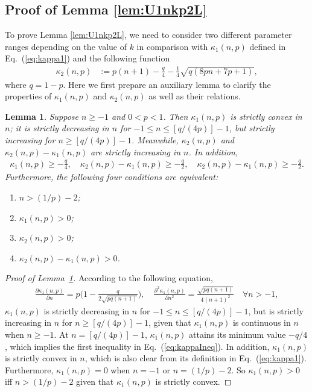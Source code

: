 \documentclass[aop]{imsart}
\theoremstyle{plain}
\newtheorem{lemma}[theorem]{Lemma}
\theoremstyle{remark}
\newcommand{\1}{\operatorname{\uppercase\expandafter{\romannumeral1}}}
\newcommand{\2}{\operatorname{\uppercase\expandafter{\romannumeral2}}}
\newcommand{\3}{\operatorname{\uppercase\expandafter{\romannumeral3}}}
\newcommand{\4}{\operatorname{\uppercase\expandafter{\romannumeral4}}}
\newcommand{\5}{\operatorname{\uppercase\expandafter{\romannumeral5}}}
\newcommand{\6}{\operatorname{\uppercase\expandafter{\romannumeral6}}}
\newcommand{\7}{\operatorname{\uppercase\expandafter{\romannumeral7}}}
\newcommand{\8}{\operatorname{\uppercase\expandafter{\romannumeral8}}}
\newcommand{\9}{\operatorname{\uppercase\expandafter{\romannumeral9}}}
\newcommand{\eref}[1]{Eq.~\textup{(\ref{#1})}}
\newcommand{\lref}[1]{Lemma~\ref{#1}}
\begin{document}
\begin{appendix}
\subsection{Proof of Lemma \ref{lem:U1nkp2L}}
To prove Lemma \ref{lem:U1nkp2L}, we need to consider two different parameter ranges depending on the value of $k$ in comparison with $\kappa_1(n,p)$ defined in \eref{eq:kappa1} and  the following function 
\begin{align}
\kappa_2(n,p)&:=p(n+1)-\frac{q}{4}-\frac{1}{4}\sqrt{q(8p n+7p +1)}, \label{eq:kappa2}
\end{align}
where $q=1-p$. 
Here we first prepare an auxiliary lemma to clarify the properties of $\kappa_1(n,p)$ and $\kappa_2(n,p)$ as well as their relations. 
\begin{lemma}\label{lem:kappa}
	Suppose $n\geq -1$ and $0<p<1$. Then 	$\kappa_1(n,p)$ 	is strictly convex in $n$; it is strictly decreasing in $n$ for $-1\leq  n\leq [q/(4p)]-1$, but  strictly increasing  for $n\geq [q/(4p)]-1$. 
Meanwhile, $\kappa_2(n,p)$ and $\kappa_2(n,p)-\kappa_1(n,p)$ are  strictly increasing in $n$.	In addition,
\begin{align}
\kappa_1(n,p)\geq -\frac{q}{4},\quad \kappa_2(n,p)-\kappa_1(n,p)\geq -\frac{q}{2},\quad \kappa_2(n,p)-\kappa_1(n,p)\geq -\frac{q}{2}. \label{eq:kappaIneq}
\end{align}	
Furthermore, the following four conditions are equivalent:
	\begin{enumerate}
		\item  $n> (1/p)-2$;
		\item $\kappa_1(n,p)> 0$;
		\item $\kappa_2(n,p)> 0$;
		\item $\kappa_2(n,p)-\kappa_1(n,p)> 0$. 
	\end{enumerate} 
\end{lemma}


\begin{proof}[Proof of \lref{lem:kappa}]
 According to the following equation, 
	\begin{align}
	\frac{\partial \kappa_1(n,p)}{\partial n}=p\biggl(1-\frac{q}{2\sqrt{pq( n+1)}}\biggr),\quad 
	\frac{\partial^2\kappa_1(n,p)}{\partial n^2}=\frac{\sqrt{pq( n+1)}}{4(n+1)^2} \quad \forall  n>-1,
	\end{align}
	$\kappa_1(n,p)$ is strictly decreasing in $n$ for $-1\leq  n\leq [q/(4p)]-1$, but is strictly increasing in $n$ for $n\geq [q/(4p)]-1$, given that  $\kappa_1(n,p)$ is continuous in $n$ when $n\geq -1$. 
At $n= [q/(4p)]-1$, $\kappa_1(n,p)$ attains its minimum value $-q/4$, which implies the first inequality in \eref{eq:kappaIneq}. 
	In addition, $\kappa_1(n,p)$ is strictly convex in $n$, which is also clear from its definition in \eref{eq:kappa1}.
	Furthermore, $\kappa_1(n,p)=0$ when $n=-1$ or $n= (1/p)-2$. 
So   $\kappa_1(n,p)> 0$ iff $n> (1/p)-2$ given  that $\kappa_1(n,p)$ 	is strictly convex. 



\end{proof}
\end{appendix}
\end{document}
